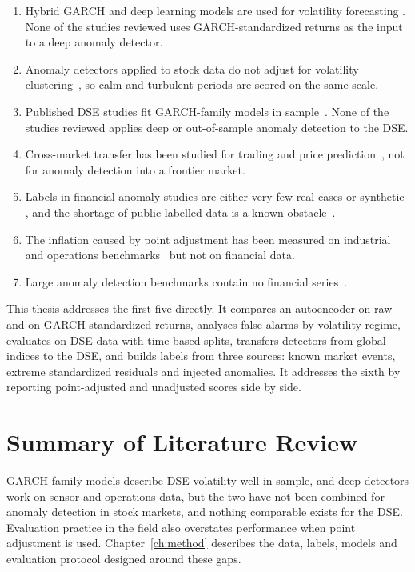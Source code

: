 \begin{enumerate}
    \item Hybrid GARCH and deep learning models are used for volatility forecasting
    \cite{kim2018forecasting,koo2022hybrid}. None of the studies reviewed uses
    GARCH-standardized returns as the input to a deep anomaly detector.
    \item Anomaly detectors applied to stock data do not adjust for volatility
    clustering~\cite{golmohammadi2015time,mariani2021autoencoder}, so calm and turbulent
    periods are scored on the same scale.
    \item Published DSE studies fit GARCH-family models in
    sample~\cite{siddikee2016volatility,haque2021modeling}. None of the studies reviewed
    applies deep or out-of-sample anomaly detection to the DSE.
    \item Cross-market transfer has been studied for trading and price
    prediction~\cite{koshiyama2022quantnet,nguyen2019novel}, not for anomaly detection into a
    frontier market.
    \item Labels in financial anomaly studies are either very few real cases
    \cite{leangarun2021stock,chullamonthon2023ensemble} or synthetic
    \cite{golmohammadi2015time}, and the shortage of public labelled data is a known
    obstacle~\cite{hilal2022financial}.
    \item The inflation caused by point adjustment has been measured on industrial and
    operations benchmarks~\cite{kim2022towards,wu2023current} but not on financial data.
    \item Large anomaly detection benchmarks contain no financial
    series~\cite{paparrizos2022tsb,schmidl2022anomaly}.
\end{enumerate}

This thesis addresses the first five directly. It compares an autoencoder on raw and on
GARCH-standardized returns, analyses false alarms by volatility regime, evaluates on DSE
data with time-based splits, transfers detectors from global indices to the DSE, and builds
labels from three sources: known market events, extreme standardized residuals and injected
anomalies. It addresses the sixth by reporting point-adjusted and unadjusted scores side by
side.

\section{Summary of Literature Review}
GARCH-family models describe DSE volatility well in sample, and deep detectors work on
sensor and operations data, but the two have not been combined for anomaly detection in
stock markets, and nothing comparable exists for the DSE. Evaluation practice in the field
also overstates performance when point adjustment is used. Chapter~\ref{ch:method} describes
the data, labels, models and evaluation protocol designed around these gaps.
